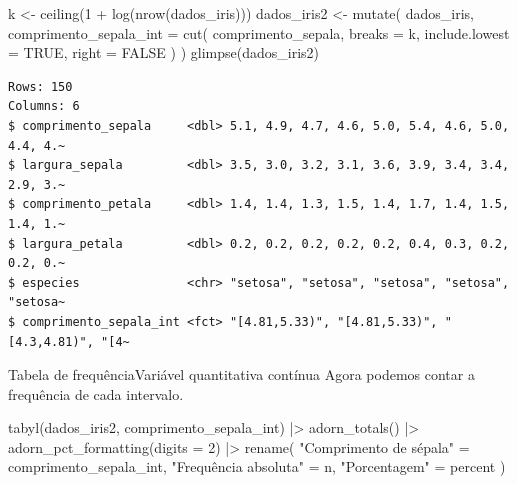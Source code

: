 \documentclass[
  10pt,
  ignorenonframetext,
]{beamer}
\newenvironment{Shaded}{\begin{snugshade}}{\end{snugshade}}
\newcommand{\AttributeTok}[1]{\textcolor[rgb]{0.40,0.45,0.13}{#1}}
\newcommand{\ConstantTok}[1]{\textcolor[rgb]{0.56,0.35,0.01}{#1}}
\newcommand{\DecValTok}[1]{\textcolor[rgb]{0.68,0.00,0.00}{#1}}
\newcommand{\FunctionTok}[1]{\textcolor[rgb]{0.28,0.35,0.67}{#1}}
\newcommand{\NormalTok}[1]{\textcolor[rgb]{0.00,0.23,0.31}{#1}}
\newcommand{\OtherTok}[1]{\textcolor[rgb]{0.00,0.23,0.31}{#1}}
\newcommand{\SpecialCharTok}[1]{\textcolor[rgb]{0.37,0.37,0.37}{#1}}
\newcommand{\StringTok}[1]{\textcolor[rgb]{0.13,0.47,0.30}{#1}}
\begin{document}
\begin{frame}[fragile]
\small

\begin{Shaded}
\begin{Highlighting}[]
\NormalTok{k }\OtherTok{\textless{}{-}} \FunctionTok{ceiling}\NormalTok{(}\DecValTok{1} \SpecialCharTok{+} \FunctionTok{log}\NormalTok{(}\FunctionTok{nrow}\NormalTok{(dados\_iris)))}
\NormalTok{dados\_iris2 }\OtherTok{\textless{}{-}} \FunctionTok{mutate}\NormalTok{(}
\NormalTok{  dados\_iris,}
  \AttributeTok{comprimento\_sepala\_int =} \FunctionTok{cut}\NormalTok{(}
\NormalTok{    comprimento\_sepala,}
    \AttributeTok{breaks =}\NormalTok{ k,}
    \AttributeTok{include.lowest =} \ConstantTok{TRUE}\NormalTok{,}
    \AttributeTok{right =} \ConstantTok{FALSE}
\NormalTok{  )}
\NormalTok{)}
\FunctionTok{glimpse}\NormalTok{(dados\_iris2)}
\end{Highlighting}
\end{Shaded}

\begin{verbatim}
Rows: 150
Columns: 6
$ comprimento_sepala     <dbl> 5.1, 4.9, 4.7, 4.6, 5.0, 5.4, 4.6, 5.0, 4.4, 4.~
$ largura_sepala         <dbl> 3.5, 3.0, 3.2, 3.1, 3.6, 3.9, 3.4, 3.4, 2.9, 3.~
$ comprimento_petala     <dbl> 1.4, 1.4, 1.3, 1.5, 1.4, 1.7, 1.4, 1.5, 1.4, 1.~
$ largura_petala         <dbl> 0.2, 0.2, 0.2, 0.2, 0.2, 0.4, 0.3, 0.2, 0.2, 0.~
$ especies               <chr> "setosa", "setosa", "setosa", "setosa", "setosa~
$ comprimento_sepala_int <fct> "[4.81,5.33)", "[4.81,5.33)", "[4.3,4.81)", "[4~
\end{verbatim}

\normalsize
\end{frame}

\begin{frame}[fragile]{Tabela de frequência\newline Variável
quantitativa contínua}
\protect\hypertarget{tabela-de-frequuxeanciavariuxe1vel-quantitativa-contuxednua-2}{}
Agora podemos contar a frequência de cada intervalo.

\begin{Shaded}
\begin{Highlighting}[]
\FunctionTok{tabyl}\NormalTok{(dados\_iris2, comprimento\_sepala\_int) }\SpecialCharTok{|\textgreater{}}
  \FunctionTok{adorn\_totals}\NormalTok{() }\SpecialCharTok{|\textgreater{}}
  \FunctionTok{adorn\_pct\_formatting}\NormalTok{(}\AttributeTok{digits =} \DecValTok{2}\NormalTok{) }\SpecialCharTok{|\textgreater{}}
  \FunctionTok{rename}\NormalTok{(}
    \StringTok{"Comprimento de sépala"} \OtherTok{=}\NormalTok{ comprimento\_sepala\_int,}
    \StringTok{"Frequência absoluta"} \OtherTok{=}\NormalTok{ n,}
    \StringTok{"Porcentagem"} \OtherTok{=}\NormalTok{ percent}
\NormalTok{  )}
\end{Highlighting}
\end{Shaded}
\end{frame}
\end{document}
